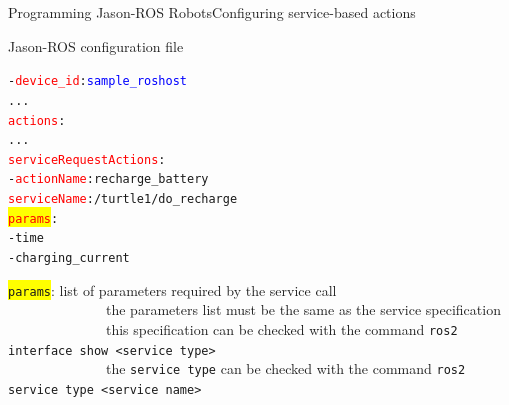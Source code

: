 \documentclass[compress]{beamer}
\newcommand{\yamlkey}[1]{\textcolor{red}{\texttt{#1}}}
\newcommand{\yamlvalue}[1]{\textcolor{blue}{\texttt{#1}}}
\begin{document}
\begin{frame}[fragile]{Programming Jason-ROS Robots}{Configuring service-based actions}{}


\footnotesize
%
    

 
\begin{block}{Jason-ROS configuration file}


\scriptsize
\begin{alltt}\scriptsize
- \yamlkey{device_id}: \yamlvalue{sample_roshost}
     ...
  \yamlkey{actions}:        
        ...
     \yamlkey{serviceRequestActions}:
        - \yamlkey{actionName}: recharge_battery
          \yamlkey{serviceName}: /turtle1/do_recharge
          \colorbox{yellow}{\yamlkey{params}}:
             - time
             - charging_current
\end{alltt}
    
\end{block}  

 
 \colorbox{yellow}{\texttt{params}}: list of parameters required by the service call\\
 
 \vspace{-.5cm}
 \ \ \ \ \ \ \ \ \ \ \ \ \ \ {\tiny the parameters list must be the same as the service specification}\\ 
 
 \vspace{-.5cm}
 \ \ \ \ \ \ \ \ \ \ \ \ \ \  {\tiny this specification can be checked with the command \texttt{ros2 interface show <service type>}}\\
 
 \vspace{-.5cm}
 \ \ \ \ \ \ \ \ \ \ \ \ \ \  {\tiny the \texttt{service type} can be checked with the command \texttt{ros2 service type <service name>}} \\
 

\end{frame}
\end{document}
